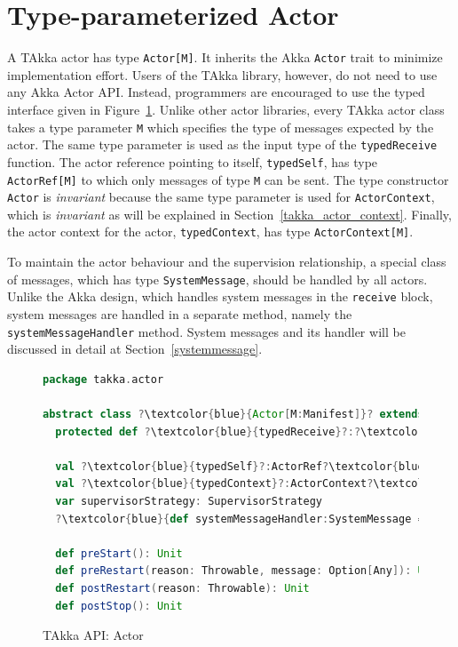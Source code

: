 \section{Type-parameterized Actor}
\label{takka_actor}
A TAkka actor has type {\tt Actor[M]}.  It inherits the Akka {\tt Actor} 
trait to minimize implementation effort.  Users of the TAkka library, 
however, do not need to use any Akka Actor API.  Instead, programmers are 
encouraged to use the typed interface given in Figure~\ref{takka_actor_api}.  
Unlike other actor libraries, every TAkka actor class takes a type parameter 
{\tt M} which specifies the type of messages expected by the actor.  The same 
type parameter is used as the input type of the {\tt typedReceive} function.  
The actor reference pointing to itself, {\tt typedSelf}, has type {\tt 
ActorRef[M]} to which only messages of type {\tt M} can be sent.  
The type constructor {\tt Actor} is {\it invariant} because the same type parameter is
used for {\tt ActorContext}, which is {\it invariant} as will be explained in Section~\ref{takka_actor_context}.
Finally, the actor context for the actor, {\tt typedContext}, has type {\tt ActorContext[M]}.  

To maintain the actor behaviour and the supervision relationship, a special class
of messages, which has type {\tt SystemMessage}, should be handled by all actors.
Unlike the Akka design, which handles system messages in the {\tt receive} block,
system messages are handled in a separate method, namely the {\tt systemMessageHandler} method.
System messages and its handler will be discussed in detail at Section~\ref{systemmessage}.


\begin{figure}[h]
\begin{lstlisting}[language=scala, escapechar=?]
package takka.actor

abstract class ?\textcolor{blue}{Actor[M:Manifest]}? extends akka.actor.Actor
  protected def ?\textcolor{blue}{typedReceive}?:?\textcolor{blue}{Function}?[?\textcolor{blue}{M}?, Unit]
  
  val ?\textcolor{blue}{typedSelf}?:ActorRef?\textcolor{blue}{[M]}?
  val ?\textcolor{blue}{typedContext}?:ActorContext?\textcolor{blue}{[M]}?
  var supervisorStrategy: SupervisorStrategy
  ?\textcolor{blue}{def systemMessageHandler:SystemMessage => Unit}?
  
  def preStart(): Unit
  def preRestart(reason: Throwable, message: Option[Any]): Unit
  def postRestart(reason: Throwable): Unit
  def postStop(): Unit
\end{lstlisting}
\caption{TAkka API: Actor}
\label{takka_actor_api}
\end{figure}

